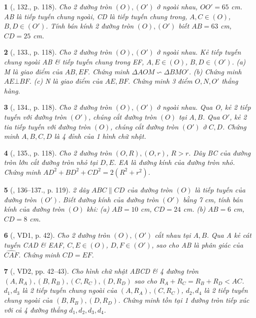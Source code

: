 \documentclass{article}
\newtheorem{baitoan}{}
\begin{document}
\begin{baitoan}[\cite{Binh_Toan_9_tap_1}, 132., p. 118]
	Cho 2 đường tròn $(O),(O')$ ở ngoài nhau, $OO' = 65$ {\rm cm}. AB là tiếp tuyến chung ngoài, CD là tiếp tuyến chung trong, $A,C\in(O)$, $B,D\in(O')$. Tính bán kính 2 đường tròn $(O),(O')$ biết $AB = 63$ {\rm cm}, $CD = 25$ {\rm cm}.
\end{baitoan}

\begin{baitoan}[\cite{Binh_Toan_9_tap_1}, 133., p. 118]
	Cho 2 đường tròn $(O),(O')$ ở ngoài nhau. Kẻ tiếp tuyến chung ngoài AB \& tiếp tuyến chung trong EF, $A,E\in(O)$, $B,D\in(O')$. (a) M là giao điểm của $AB,EF$. Chứng minh $\Delta AOM\backsim\Delta BMO'$. (b) Chứng minh $AE\bot BF$. (c) N là giao điểm của $AE,BF$. Chứng minh 3 điểm $O,N,O'$ thẳng hàng.
\end{baitoan}

\begin{baitoan}[\cite{Binh_Toan_9_tap_1}, 134., p. 118]
	Cho 2 đường tròn $(O),(O')$ ở ngoài nhau. Qua O, kẻ 2 tiếp tuyến với đường tròn $(O')$, chúng cắt đường tròn $(O)$ tại $A,B$. Qua $O'$, kẻ 2 tia tiếp tuyến với đường tròn $(O)$, chúng cắt đường tròn $(O')$ ở $C,D$. Chứng minh $A,B,C,D$ là 4 đỉnh của 1 hình chữ nhật.
\end{baitoan}

\begin{baitoan}[\cite{Binh_Toan_9_tap_1}, 135., p. 118]
	Cho 2 đường tròn $(O,R),(O,r)$, $R > r$. Dây BC của đường tròn lớn cắt đường tròn nhỏ tại $D,E$. EA là đường kính của đường tròn nhỏ. Chứng minh $AD^2 + BD^2 + CD^2 = 2(R^2 + r^2)$.
\end{baitoan}

\begin{baitoan}[\cite{Binh_Toan_9_tap_1}, 136--137., p. 119]
	2 dây $ABC\parallel CD$ của đường tròn $(O)$ là tiếp tuyến của đường tròn $(O')$. Biết đường kính của đường tròn $(O')$ bằng {\rm7 cm}, tính bán kính của đường tròn $(O)$ khi: (a) $AB = 10$ {\rm cm}, $CD = 24$ {\rm cm}. (b) $AB = 6$ {\rm cm}, $CD = 8$ {\rm cm}.
\end{baitoan}

\begin{baitoan}[\cite{TLCT_THCS_Toan_9_hinh_hoc}, VD1, p. 42]
	Cho 2 đường tròn $(O),(O')$ cắt nhau tại $A,B$. Qua A kẻ cát tuyến CAD \& EAF, $C,E\in(O)$, $D,F\in(O')$, sao cho AB là phân giác của $\widehat{CAF}$. Chứng minh $CD = EF$.
\end{baitoan}

\begin{baitoan}[\cite{TLCT_THCS_Toan_9_hinh_hoc}, VD2, pp. 42--43]
	Cho hình chữ nhật ABCD \& 4 đường tròn $(A,R_A),(B,R_B),(C,R_C),(D,R_D)$ sao cho $R_A + R_C = R_B + R_D < AC$. $d_1,d_3$ là 2 tiếp tuyến chung ngoài của $(A,R_A),(C,R_C)$, $d_2,d_4$ là 2 tiếp tuyến chung ngoài của $(B,R_B),(D,R_D)$. Chứng minh tồn tại 1 đường tròn tiếp xúc với cả 4 đường thẳng $d_1,d_2,d_3,d_4$.
\end{baitoan}
\end{document}
